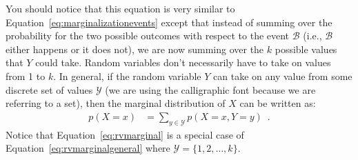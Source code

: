 \documentclass[assignment02_Solutions]{subfiles}
\begin{document}
You should notice that this equation is very similar to Equation~\ref{eq:marginalizationevents} except that instead of summing over the probability for the two possible outcomes with respect to the event $\mathcal{B}$ (i.e., $\mathcal{B}$ either happens or it does not), we are now summing over the $k$ possible values that $Y$ could take.  Random variables don't necessarily have to take on values from 1 to $k$.  In general, if the random variable $Y$ can take on any value from some discrete set of values $\mathcal{Y}$ (we are using the calligraphic font because we are referring to a set), then the marginal distribution of $X$ can be written as:
\begin{align}
p(X=x) &= \sum_{y \in \mathcal{Y}} p(X=x, Y=y) \enspace . \label{eq:rvmarginalgeneral}
\end{align}
Notice that Equation~\ref{eq:rvmarginal} is a special case of Equation~\ref{eq:rvmarginalgeneral} where $\mathcal{Y} = \{1, 2, \ldots, k\}$.
\end{document}
